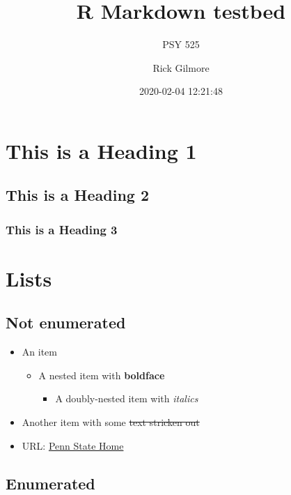 \documentclass[]{article}
\title{R Markdown testbed}
\subtitle{PSY 525}
\author{Rick Gilmore}
\date{2020-02-04 12:21:48}
\providecommand{\tightlist}{%
  \setlength{\itemsep}{0pt}\setlength{\parskip}{0pt}}
\begin{document}
\maketitle

\hypertarget{this-is-a-heading-1}{%
\section{This is a Heading 1}\label{this-is-a-heading-1}}

\hypertarget{this-is-a-heading-2}{%
\subsection{This is a Heading 2}\label{this-is-a-heading-2}}

\hypertarget{this-is-a-heading-3}{%
\subsubsection{This is a Heading 3}\label{this-is-a-heading-3}}

\hypertarget{lists}{%
\section{Lists}\label{lists}}

\hypertarget{not-enumerated}{%
\subsection{Not enumerated}\label{not-enumerated}}

\begin{itemize}
\tightlist
\item
  An item

  \begin{itemize}
  \tightlist
  \item
    A nested item with \textbf{boldface}

    \begin{itemize}
    \tightlist
    \item
      A doubly-nested item with \emph{italics}
    \end{itemize}
  \end{itemize}
\item
  Another item with some \sout{text stricken out}
\item
  URL: \href{https://www.psu.edu}{Penn State Home}
\end{itemize}

\hypertarget{enumerated}{%
\subsection{Enumerated}\label{enumerated}}
\end{document}
